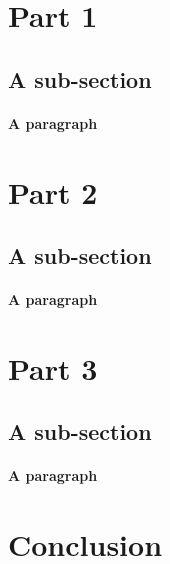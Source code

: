 \documentclass[11pt, oneside]{article}
\begin{document}
\section{Part 1}
\subsection{A sub-section}
\paragraph{A paragraph}

\section{Part 2}
\subsection{A sub-section}
\paragraph{A paragraph}

\section{Part 3}
\subsection{A sub-section}
\paragraph{A paragraph}

\section{Conclusion}
\end{document}
